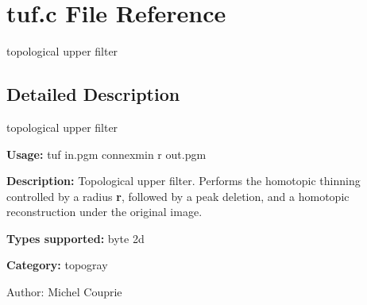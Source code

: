\section{tuf.c File Reference}
\label{tuf_8c}
topological upper filter 



\subsection{Detailed Description}
topological upper filter 

{\bf Usage:} tuf in.pgm connexmin r out.pgm

{\bf Description:} Topological upper filter. Performs the homotopic thinning controlled by a radius {\bf r}, followed by a peak deletion, and a homotopic reconstruction under the original image.

{\bf Types supported:} byte 2d

{\bf Category:} topogray

\begin{Desc}
\item[Author:]Michel Couprie \end{Desc}
